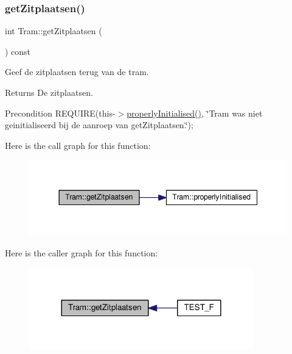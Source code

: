 \subsubsection{\texorpdfstring{get\+Zitplaatsen()}{getZitplaatsen()}}
{\footnotesize\ttfamily int Tram\+::get\+Zitplaatsen (\begin{DoxyParamCaption}{ }\end{DoxyParamCaption}) const}



Geef de zitplaatsen terug van de tram. 

\begin{DoxyReturn}{Returns}
De zitplaatsen. 
\end{DoxyReturn}
\begin{DoxyPrecond}{Precondition}
R\+E\+Q\+U\+I\+RE(this-\/$>$\hyperlink{class_tram_ac2688f590e4db232b4f535c9bf959efb}{properly\+Initialised()}, \char`\"{}\+Tram was niet geinitialiseerd bij de aanroep van get\+Zitplaatsen.\char`\"{}); 
\end{DoxyPrecond}
Here is the call graph for this function\+:\nopagebreak
\begin{figure}[H]
\begin{center}
\leavevmode
\includegraphics[width=344pt]{class_tram_abcb1ce0d10e394fce8a99b460e5104de_cgraph}
\end{center}
\end{figure}
Here is the caller graph for this function\+:\nopagebreak
\begin{figure}[H]
\begin{center}
\leavevmode
\includegraphics[width=276pt]{class_tram_abcb1ce0d10e394fce8a99b460e5104de_icgraph}
\end{center}
\end{figure}
\mbox{\label{class_tram_aaeb00c535a6854f85dcc42cdff97ad0c}} 
